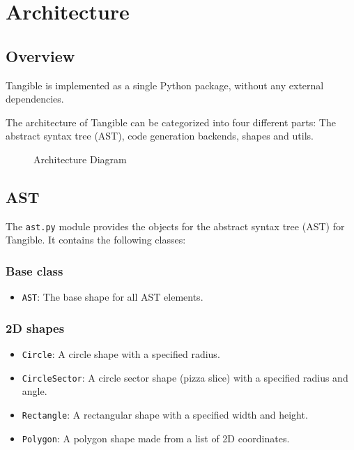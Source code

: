 
\chapter{Architecture}

\label{ch:architecture}


\section{Overview}\label{sec:overview}

Tangible is implemented as a single Python package, without any external
dependencies.

The architecture of Tangible can be categorized into four different parts: The
abstract syntax tree (AST), code generation backends, shapes and utils.

\begin{figure}[h]
	\centering
	
	\caption{Architecture Diagram}
	\label{img:architecture}
\end{figure}


\section{AST}\label{sec:ast}

The \texttt{ast.py} module provides the objects for the abstract syntax tree
(AST) for Tangible. It contains the following classes:

\subsection{Base class}

\begin{itemize}
	\item \texttt{AST}: The base shape for all AST elements.
\end{itemize}

\subsection{2D shapes}

\begin{itemize}
	\item \texttt{Circle}: A circle shape with a specified radius.
	\item \texttt{CircleSector}: A circle sector shape (pizza slice) with a
		specified radius and angle.
	\item \texttt{Rectangle}: A rectangular shape with a specified width and
		height.
	\item \texttt{Polygon}: A polygon shape made from a list of 2D coordinates.
\end{itemize}


